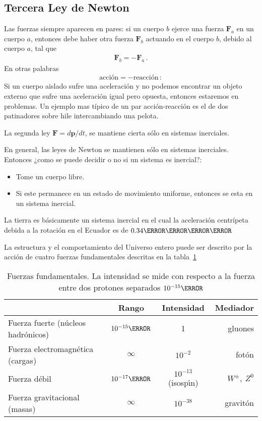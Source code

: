\subsection{Tercera Ley de Newton}
Las fuerzas siempre aparecen en pares: si un cuerpo $b$ ejerce una fuerza $\mathbf{F}_a$ en un cuerpo $a$, entonces debe haber otra fuerza $\mathbf{F}_b$ actuando en el cuerpo $b$, debido al cuerpo $a$, tal que
\begin{align}
  \mathbf{F}_b=-\mathbf{F}_a\,.
\end{align}
En otras palabras
\begin{align}
  \text{acci\'on}=-\text{reacci\'on}\,:
\end{align}
Si un cuerpo aislado sufre una aceleraci\'on y no podemos encontrar un objeto externo que sufre una aceleraci\'on igual pero opuesta, entonces estaremos en problemas. Un ejemplo mas típico de un par acción-reacción es el de dos patinadores sobre hile intercambiando una pelota.

La segunda ley $\mathbf{F}=d\mathbf{p}/dt$, se mantiene cierta sólo en sistemas inerciales.

En general, las leyes de Newton se mantienen s\'olo en sistemas inerciales. Entonces ¿como se puede decidir o no si un sistema es inercial?:
\begin{itemize}
\item Tome un cuerpo libre.
\item Si este permanece en un estado de movimiento uniforme, entonces se esta en un sistema inercial.
\end{itemize}

La tierra es b\'asicamente un sistema inercial en el cual la aceleración centrípeta debida a la rotación en el Ecuador es de $0.34\meter\per\second\squared$

La estructura y el comportamiento del Universo entero puede ser descrito por la acción de cuatro fuerzas fundamentales descritas en la tabla~\ref{tab:forces}
\begin{table}
  \centering
  \begin{tabular}{l|cc|r}
    &Rango& Intensidad&Mediador\\\hline
Fuerza fuerte (n\'ucleos hadr\'onicos) & $10^{-15}\meter$ &1 &gluones\\
Fuerza electromagn\'etica (cargas) & $\infty$ & $10^{-2}$ & fot\'on\\
Fuerza d\'ebil &$10^{-17}\meter$&$10^{-13}$ (isosp\'\i n)& $W^\pm,\ Z^0$\\
Fuerza gravitacional (masas)&$\infty$& $10^{-38}$& gravit\'on\\
  \end{tabular}
  \caption{Fuerzas fundamentales. La intensidad se mide con respecto a la fuerza entre dos protones separados $10^{-15}\meter$}
  \label{tab:forces}
\end{table}



